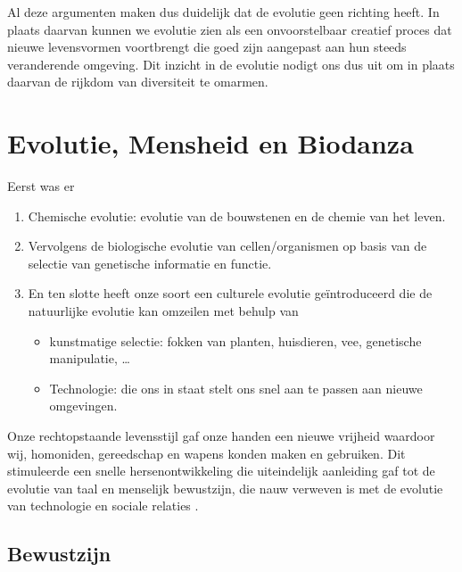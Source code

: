 \documentclass[
  11pt,
]{book}
\providecommand{\tightlist}{%
  \setlength{\itemsep}{0pt}\setlength{\parskip}{0pt}}
\begin{document}
Al deze argumenten maken dus duidelijk dat de evolutie geen richting heeft. In plaats daarvan kunnen we evolutie zien als een onvoorstelbaar creatief proces dat nieuwe levensvormen voortbrengt die goed zijn aangepast aan hun steeds veranderende omgeving. Dit inzicht in de evolutie nodigt ons dus uit om in plaats daarvan de rijkdom van diversiteit te omarmen.

\hypertarget{evolutie-mensheid-en-biodanza}{%
\section{Evolutie, Mensheid en Biodanza}\label{evolutie-mensheid-en-biodanza}}

Eerst was er

\begin{enumerate}
\def\labelenumi{\arabic{enumi}.}
\item
  Chemische evolutie: evolutie van de bouwstenen en de chemie van het leven.
\item
  Vervolgens de biologische evolutie van cellen/organismen op basis van de selectie van genetische informatie en functie.
\item
  En ten slotte heeft onze soort een culturele evolutie geïntroduceerd die de natuurlijke evolutie kan omzeilen met behulp van

  \begin{itemize}
  \tightlist
  \item
    kunstmatige selectie: fokken van planten, huisdieren, vee, genetische manipulatie, \ldots{}
  \item
    Technologie: die ons in staat stelt ons snel aan te passen aan nieuwe omgevingen.
  \end{itemize}
\end{enumerate}

Onze rechtopstaande levensstijl gaf onze handen een nieuwe vrijheid waardoor wij, homoniden, gereedschap en wapens konden maken en gebruiken. Dit stimuleerde een snelle hersenontwikkeling die uiteindelijk aanleiding gaf tot de evolutie van taal en menselijk bewustzijn, die nauw verweven is met de evolutie van technologie en sociale relaties \citep{capraLuisi2014}.

\hypertarget{bewustzijn}{%
\subsection{Bewustzijn}\label{bewustzijn}}
\end{document}
